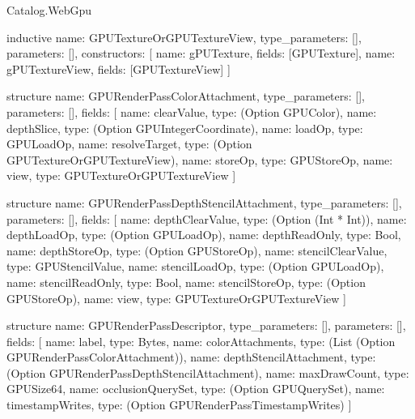 \begin{lexlean}{Catalog.WebGpu}
\begin{semanticmodule}
inductive{
  name: GPUTextureOrGPUTextureView,
  type_parameters: [],
  parameters: [],
  constructors: [
    {name: gPUTexture, fields: [GPUTexture]},
    {name: gPUTextureView, fields: [GPUTextureView]}
  ]
}

structure{
  name: GPURenderPassColorAttachment,
  type_parameters: [],
  parameters: [],
  fields: [
    {name: clearValue, type: (Option GPUColor)},
    {name: depthSlice, type: (Option GPUIntegerCoordinate)},
    {name: loadOp, type: GPULoadOp},
    {name: resolveTarget, type: (Option GPUTextureOrGPUTextureView)},
    {name: storeOp, type: GPUStoreOp},
    {name: view, type: GPUTextureOrGPUTextureView}
  ]
}

structure{
  name: GPURenderPassDepthStencilAttachment,
  type_parameters: [],
  parameters: [],
  fields: [
    {name: depthClearValue, type: (Option (Int * Int))},
    {name: depthLoadOp, type: (Option GPULoadOp)},
    {name: depthReadOnly, type: Bool},
    {name: depthStoreOp, type: (Option GPUStoreOp)},
    {name: stencilClearValue, type: GPUStencilValue},
    {name: stencilLoadOp, type: (Option GPULoadOp)},
    {name: stencilReadOnly, type: Bool},
    {name: stencilStoreOp, type: (Option GPUStoreOp)},
    {name: view, type: GPUTextureOrGPUTextureView}
  ]
}

structure{
  name: GPURenderPassDescriptor,
  type_parameters: [],
  parameters: [],
  fields: [
    {name: label, type: Bytes},
    {name: colorAttachments, type: (List (Option GPURenderPassColorAttachment))},
    {name: depthStencilAttachment, type: (Option GPURenderPassDepthStencilAttachment)},
    {name: maxDrawCount, type: GPUSize64},
    {name: occlusionQuerySet, type: (Option GPUQuerySet)},
    {name: timestampWrites, type: (Option GPURenderPassTimestampWrites)}
  ]
}
\end{semanticmodule}
\end{lexlean}
